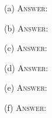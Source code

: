 (a)
\textsc{Answer:}\vspace{-2mm}
\begin{answerlong}

\end{answerlong}

(b)
\textsc{Answer:}\vspace{-2mm}
\begin{answerlong}

\end{answerlong}

(c)
\textsc{Answer:}\vspace{-2mm}
\begin{answerlong}

\end{answerlong}

(d)
\textsc{Answer:}\vspace{-2mm}
\begin{answerlong}

\end{answerlong}

(e)
\textsc{Answer:}\vspace{-2mm}
\begin{answerlong}

\end{answerlong}

(f)
\textsc{Answer:}\vspace{-2mm}
\begin{answerlong}

\end{answerlong}
